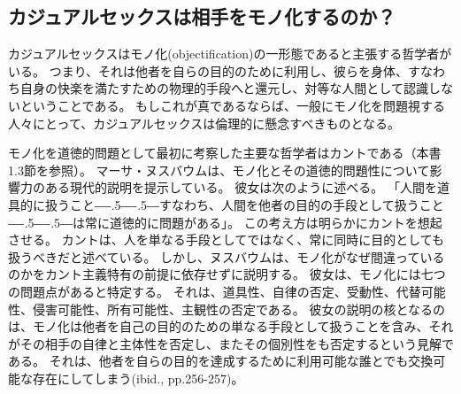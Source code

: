 \documentclass[paper=a4,book,openany]{jlreq}
\def\DDASH{―\kern-.5\zw―\kern-.5\zw―} %
\begin{document}
\subsection{カジュアルセックスは相手をモノ化するのか？}

カジュアルセックスはモノ化(objectification)の一形態であると主張する哲学者がいる。
つまり、それは他者を自らの目的のために利用し、彼らを身体、すなわち自身の快楽を満たすための物理的手段へと還元し、対等な人間として認識しないということである。
もしこれが真であるならば、一般にモノ化を問題視する人々にとって、カジュアルセックスは倫理的に懸念すべきものとなる。

モノ化を道徳的問題として最初に考察した主要な哲学者はカントである（本書1.3節を参照）。
マーサ・ヌスバウムは、モノ化とその道徳的問題性について影響力のある現代的説明を提示している。
彼女は次のように述べる。
「人間を道具的に扱うこと{\DDASH}すなわち、人間を他者の目的の手段として扱うこと{\DDASH}は常に道徳的に問題がある」\citep[p.289]{nussbaum95:_objec}。
この考え方は明らかにカントを想起させる。
カントは、人を単なる手段としてではなく、常に同時に目的としても扱うべきだと述べている。
しかし、ヌスバウムは、モノ化がなぜ間違っているのかをカント主義特有の前提に依存せずに説明する。
彼女は、モノ化には七つの問題点があると特定する。
それは、道具性、自律の否定、受動性、代替可能性、侵害可能性、所有可能性、主観性の否定である。
彼女の説明の核となるのは、モノ化は他者を自己の目的のための単なる手段として扱うことを含み、それがその相手の自律と主体性を否定し、またその個別性をも否定するという見解である。
それは、他者を自らの目的を達成するために利用可能な誰とでも交換可能な存在にしてしまう(ibid., pp.256-257)。
\end{document}
